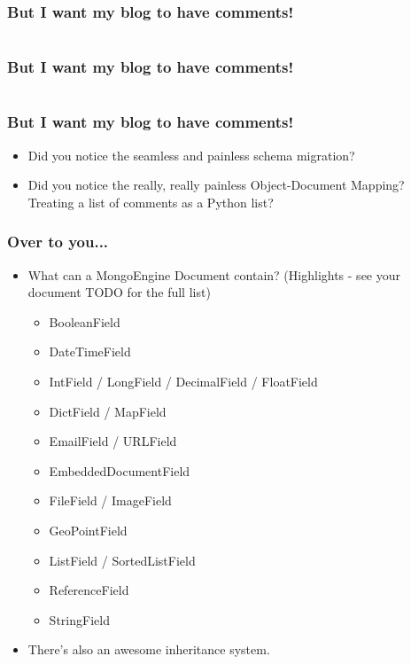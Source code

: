 \documentclass{beamer}
\begin{document}
\begin{frame}
  \frametitle{But I want my blog to have comments!}
  \inputminted[firstline=33,lastline=44]{python}{../steps/02-database/comment_example.py}
\end{frame}

\begin{frame}
  \frametitle{But I want my blog to have comments!}
  \inputminted[firstline=46,lastline=59]{python}{../steps/02-database/comment_example.py}
\end{frame}

\begin{frame}
  \frametitle{But I want my blog to have comments!}
  \begin{itemize}
  \item Did you notice the seamless and painless schema migration?
  \item Did you notice the really, really painless Object-Document
    Mapping? Treating a list of comments as a Python list?
  \end{itemize}
\end{frame}

\begin{frame}
  \frametitle{Over to you...}
  \begin{itemize}
  \item What can a MongoEngine Document contain? (Highlights - see
    your document TODO for the full list)
    \begin{itemize}
    \item BooleanField
    \item DateTimeField
    \item IntField / LongField / DecimalField / FloatField
    \item DictField / MapField
    \item EmailField / URLField
    \item EmbeddedDocumentField
    \item FileField / ImageField
    \item GeoPointField
    \item ListField / SortedListField
    \item ReferenceField
    \item StringField
    \end{itemize}
  \item There's also an awesome inheritance system.
  \end{itemize}
\end{frame}
\end{document}
